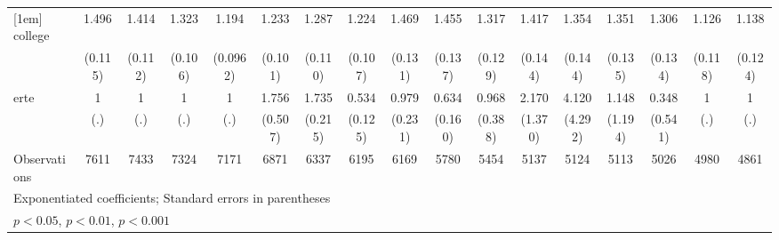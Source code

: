 {\begin{tabular}{l*{16}{c}}
[1em]
college             &       1.496\sym{***}&       1.414\sym{***}&       1.323\sym{***}&       1.194\sym{*}  &       1.233\sym{*}  &       1.287\sym{**} &       1.224\sym{*}  &       1.469\sym{***}&       1.455\sym{***}&       1.317\sym{**} &       1.417\sym{***}&       1.354\sym{**} &       1.351\sym{**} &       1.306\sym{**} &       1.126         &       1.138         \\
                    &     (0.115)         &     (0.112)         &     (0.106)         &    (0.0962)         &     (0.101)         &     (0.110)         &     (0.107)         &     (0.131)         &     (0.137)         &     (0.129)         &     (0.144)         &     (0.144)         &     (0.135)         &     (0.134)         &     (0.118)         &     (0.124)         \\
[1em]
erte                &           1         &           1         &           1         &           1         &       1.756         &       1.735\sym{***}&       0.534\sym{**} &       0.979         &       0.634         &       0.968         &       2.170         &       4.120         &       1.148         &       0.348         &           1         &           1         \\
                    &         (.)         &         (.)         &         (.)         &         (.)         &     (0.507)         &     (0.215)         &     (0.125)         &     (0.231)         &     (0.160)         &     (0.388)         &     (1.370)         &     (4.292)         &     (1.194)         &     (0.541)         &         (.)         &         (.)         \\
\hline
Observations        &        7611         &        7433         &        7324         &        7171         &        6871         &        6337         &        6195         &        6169         &        5780         &        5454         &        5137         &        5124         &        5113         &        5026         &        4980         &        4861         \\
\hline\hline
\multicolumn{17}{l}{\footnotesize Exponentiated coefficients; Standard errors in parentheses}\\
\multicolumn{17}{l}{\footnotesize \sym{*} \(p<0.05\), \sym{**} \(p<0.01\), \sym{***} \(p<0.001\)}\\
\end{tabular}
}
